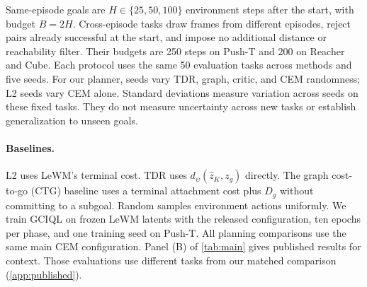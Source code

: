 \documentclass{article}
\newcommand{\dd}{d_{\psi}}
\theoremstyle{definition}
\theoremstyle{remark}
\begin{document}
Same-episode goals are $H\in\{25,50,100\}$ environment steps after the start,
with budget $B=2H$. Cross-episode tasks draw frames from different episodes, reject
pairs already successful at the start, and impose no additional distance or reachability
filter. Their budgets are 250 steps on Push-T and 200 on Reacher and Cube.
Each protocol uses the same 50 evaluation tasks across methods and five seeds.
For our planner, seeds vary TDR, graph, critic, and CEM randomness; L2 seeds vary
CEM alone. Standard deviations measure variation across seeds on these fixed tasks.
They do not measure uncertainty across new tasks or establish generalization to unseen goals.

\paragraph{Baselines.}
L2 uses LeWM's terminal cost. TDR uses $\dd(\hat z_K,z_g)$ directly.
The graph cost-to-go (CTG) baseline uses a terminal attachment cost plus $D_g$ without
committing to a subgoal. Random samples environment actions uniformly.
We train GCIQL on frozen LeWM latents with the released configuration,
ten epochs per phase, and one training seed on Push-T.
All planning comparisons use the same main CEM configuration.
Panel (B) of \cref{tab:main} gives published results for context.
Those evaluations use different tasks from our matched comparison (\cref{app:published}).
\end{document}
